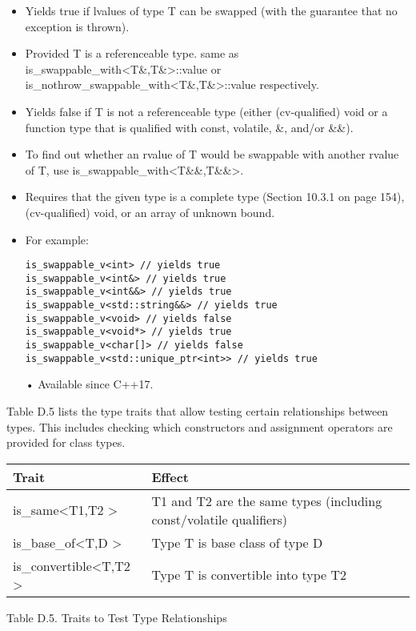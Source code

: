 \begin{itemize}
\item
Yields true if lvalues of type T can be swapped (with the guarantee that no exception is thrown).

\item
Provided T is a referenceable type. same as is\_swappable\_with<T\&,T\&>::value or is\_nothrow\_swappable\_with<T\&,T\&>::value respectively.

\item
Yields false if T is not a referenceable type (either (cv-qualified) void or a function type that is qualified with const, volatile, \&, and/or \&\&).

\item
To find out whether an rvalue of T would be swappable with another rvalue of T, use is\_swappable\_with<T\&\&,T\&\&>.

\item
Requires that the given type is a complete type (Section 10.3.1 on page 154), (cv-qualified) void, or an array of unknown bound.

\item
For example:
\begin{lstlisting}[style=styleCXX]
is_swappable_v<int> // yields true
is_swappable_v<int&> // yields true
is_swappable_v<int&&> // yields true
is_swappable_v<std::string&&> // yields true
is_swappable_v<void> // yields false
is_swappable_v<void*> // yields true
is_swappable_v<char[]> // yields false
is_swappable_v<std::unique_ptr<int>> // yields true
\end{lstlisting}

• Available since C++17.
\end{itemize}


Table D.5 lists the type traits that allow testing certain relationships between types. This includes checking which constructors and assignment operators are provided for class types.

\begin{table}[H]
	\begin{tabular}{|l|l|}
		\hline
		\textbf{Trait}                                & \textbf{Effect}                                                    \\ \hline
		is\_same\textless{}T1,T2 \textgreater{}       & T1 and T2 are the same types (including const/volatile qualifiers) \\ \hline
		is\_base\_of\textless{}T,D \textgreater{}     & Type T is base class of type D                                     \\ \hline
		is\_convertible\textless{}T,T2 \textgreater{} & Type T is convertible into type T2                                 \\ \hline
	\end{tabular}
\end{table}

\begin{center}
Table D.5. Traits to Test Type Relationships
\end{center}









